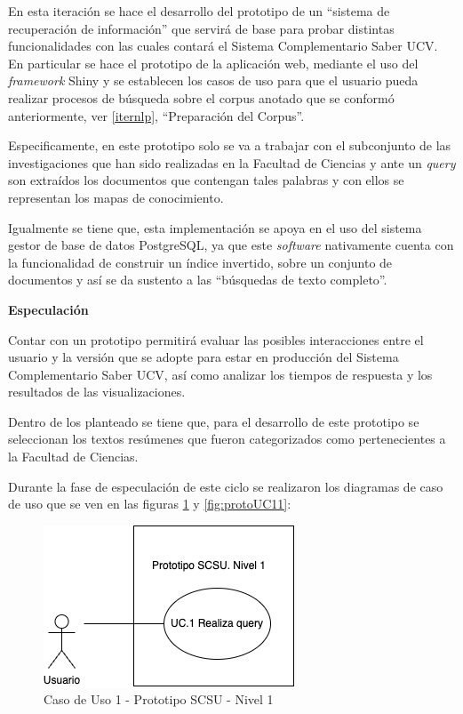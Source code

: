\documentclass[
  12pt,
  openany]{book}
\begin{document}
En esta iteración se hace el desarrollo del prototipo de un ``sistema de recuperación de información'' que servirá de base para probar distintas funcionalidades con las cuales contará el Sistema Complementario Saber UCV. En particular se hace el prototipo de la aplicación web, mediante el uso del \emph{framework} Shiny y se establecen los casos de uso para que el usuario pueda realizar procesos de búsqueda sobre el corpus anotado que se conformó anteriormente, ver \ref{iternlp}, ``Preparación del Corpus''.

Especificamente, en este prototipo solo se va a trabajar con el subconjunto de las investigaciones que han sido realizadas en la Facultad de Ciencias y ante un \emph{query} son extraídos los documentos que contengan tales palabras y con ellos se representan los mapas de conocimiento.

Igualmente se tiene que, esta implementación se apoya en el uso del sistema gestor de base de datos PostgreSQL, ya que este \emph{software} nativamente cuenta con la funcionalidad de construir un índice invertido, sobre un conjunto de documentos y así se da sustento a las ``búsquedas de texto completo''.

\textbf{Especulación}

Contar con un prototipo permitirá evaluar las posibles interacciones entre el usuario y la versión que se adopte para estar en producción del Sistema Complementario Saber UCV, así como analizar los tiempos de respuesta y los resultados de las visualizaciones.

Dentro de los planteado se tiene que, para el desarrollo de este prototipo se seleccionan los textos resúmenes que fueron categorizados como pertenecientes a la Facultad de Ciencias.

Durante la fase de especulación de este ciclo se realizaron los diagramas de caso de uso que se ven en las figuras \ref{fig:protoUC1} y \ref{fig:protoUC11}:

\newpage

\begin{figure}

{\centering \includegraphics[width=0.45\linewidth]{images/05-desarrollo/2_ciclo/UC/prototipo_nivel1} 

}

\caption{Caso de Uso 1 - Prototipo SCSU - Nivel 1}\label{fig:protoUC1}
\end{figure}
\end{document}
